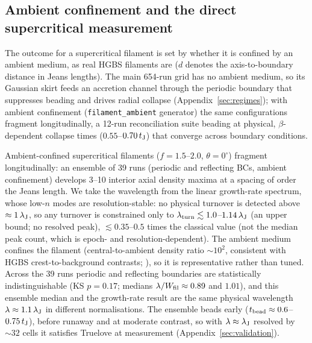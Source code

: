 \documentclass[usenatbib,twoside,twocolumn]{mnras}
\begin{document}
\subsection{Ambient confinement and the direct supercritical measurement}
\label{sec:modecompetition}

The outcome for a supercritical filament is set by whether it is confined by an ambient medium, as real HGBS filaments are ($d$ denotes the axis-to-boundary distance in Jeans lengths). The main 654-run grid has no ambient medium, so its Gaussian skirt feeds an accretion channel through the periodic boundary that suppresses beading and drives radial collapse (Appendix~\ref{sec:regimes}); with ambient confinement (\texttt{filament\_ambient} generator) the same configurations fragment longitudinally, a 12-run reconciliation suite beading at physical, $\beta$-dependent collapse times ($0.55$--$0.70\,t_{\rm J}$) that converge across boundary conditions.

Ambient-confined supercritical filaments ($f=1.5$--$2.0$, $\theta=0^\circ$) fragment longitudinally: an ensemble of 39 runs (periodic and reflecting BCs, ambient confinement) develops 3--10 interior axial density maxima at a spacing of order the Jeans length. We take the wavelength from the linear growth-rate spectrum, whose low-$n$ modes are resolution-stable: no physical turnover is detected above $\approx1\,\lambda_{\rm J}$, so any turnover is constrained only to $\lambda_{\rm turn}\lesssim1.0$--$1.14\,\lambda_{\rm J}$ (an upper bound; no resolved peak), $\lesssim0.35$--$0.5$ times the classical value (not the median peak count, which is epoch- and resolution-dependent). The ambient medium confines the filament (central-to-ambient density ratio $\sim10^2$, consistent with HGBS crest-to-background contrasts; \citealt{Arzoumanian2019}), so it is representative rather than tuned. Across the 39 runs periodic and reflecting boundaries are statistically indistinguishable (KS $p=0.17$; medians $\lambda/W_{\rm fil}\approx0.89$ and $1.01$), and this ensemble median and the growth-rate result are the same physical wavelength $\lambda\approx1.1\,\lambda_{\rm J}$ in different normalisations. The ensemble beads early ($t_{\rm bead}\approx0.6$--$0.75\,t_{\rm J}$), before runaway and at moderate contrast, so with $\lambda\approx\lambda_{\rm J}$ resolved by ${\sim}32$ cells it satisfies Truelove at measurement (Appendix~\ref{sec:validation}).
\end{document}
